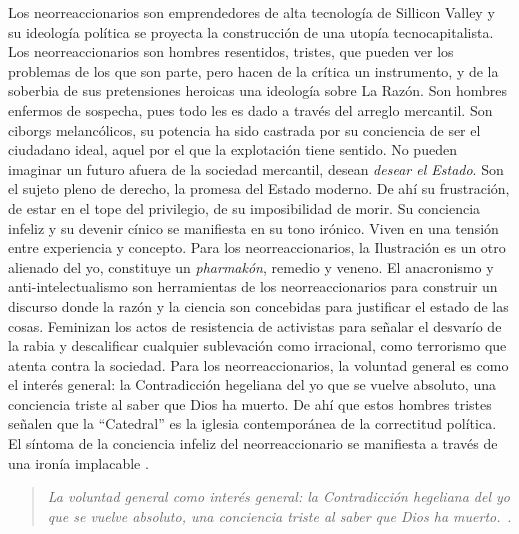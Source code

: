 Los neorreaccionarios son emprendedores de alta tecnología de Sillicon Valley y su ideología política se proyecta la construcción de una utopía tecnocapitalista. Los neorreaccionarios son hombres resentidos, tristes, que pueden ver los problemas de los que son parte, pero hacen de la crítica un instrumento, y de la soberbia de sus pretensiones heroicas una ideología sobre La Razón. Son hombres enfermos de sospecha, pues todo les es dado a través del arreglo mercantil. Son ciborgs melancólicos, su potencia ha sido castrada por su conciencia de ser el ciudadano ideal, aquel por el que la explotación tiene sentido. No pueden imaginar un futuro afuera de la sociedad mercantil, desean \emph{desear el Estado}. Son el sujeto pleno de derecho, la promesa del Estado moderno. De ahí su frustración, de estar en el tope del privilegio, de su imposibilidad de morir. Su conciencia infeliz y su devenir cínico se manifiesta en su tono irónico. Viven en una tensión entre experiencia y concepto. Para los neorreaccionarios, la Ilustración es un otro alienado del yo, constituye un \emph{pharmakón}, remedio y veneno. El anacronismo y anti-intelectualismo son herramientas de los neorreaccionarios para construir un discurso donde la razón y la ciencia son concebidas para justificar el estado de las cosas. Feminizan los actos de resistencia de activistas para señalar el desvarío de la rabia y descalificar cualquier sublevación como irracional, como terrorismo que atenta contra la sociedad. Para los neorreaccionarios, la voluntad general es como el interés general: la Contradicción hegeliana del yo que se vuelve absoluto, una conciencia triste al saber que Dios ha muerto. De ahí que estos hombres tristes señalen que la \enquote{Catedral} es la iglesia contemporánea de la correctitud política. El síntoma de la conciencia infeliz del neorreaccionario se manifiesta a través de una ironía implacable \autocite{huiUnhappyConsciousnessNeoreactionaries2017}.

\begin{quote}
  \emph{La voluntad general como interés general: la Contradicción hegeliana del yo que se vuelve absoluto, una conciencia triste al saber que Dios ha muerto.}~\autocite{huiUnhappyConsciousnessNeoreactionaries2017}.
\end{quote}

